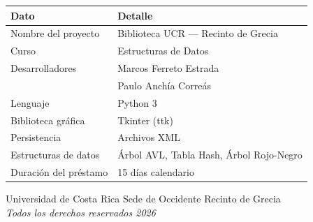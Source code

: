 \documentclass[12pt, a4paper]{article}
\begin{document}
\begin{center}
  \begin{tabular}{@{}ll@{}}
    \toprule
    \textbf{Dato}          & \textbf{Detalle} \\
    \midrule
    Nombre del proyecto    & Biblioteca UCR --- Recinto de Grecia \\
    Curso                  & Estructuras de Datos \\
    Desarrolladores        & Marcos Ferreto Estrada \\
                           & Paulo Anchía Correás \\
    Lenguaje               & Python 3 \\
    Biblioteca gráfica     & Tkinter (ttk) \\
    Persistencia           & Archivos XML \\
    Estructuras de datos   & Árbol AVL, Tabla Hash, Árbol Rojo-Negro \\
    Duración del préstamo  & 15 días calendario \\
    \bottomrule
  \end{tabular}
\end{center}

\vfill
\begin{center}
  \small\color{gray}
  Universidad de Costa Rica \textbullet{} Sede de Occidente \textbullet{}
  Recinto de Grecia\\
  \textit{Todos los derechos reservados \textbullet{} 2026}
\end{center}
\end{document}
